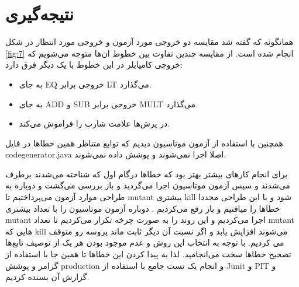\section{نتیجه‌گیری}

همانگونه که گفته شد مقایسه دو خروجی مورد آزمون و خروجی مورد انتظار در شکل \ref{fig:7} انجام شده است. 
از مقایسه چندین تفاوت بین خطوط ان‌ها متوجه می‌شویم که خروجی کامپایلر در این خطوط با یک دیگر فرق دارد:
\begin{itemize}
\item 
به جای EQ خروجی برابر LT می‌گذارد.
\item
به جای ADD و SUB خروجی برابر MULT می‌گذارد.
\item
در پرش‌ها علامت شارپ را فراموش می‌کند.
\end{itemize}

همچنین با استفاده از آزمون موتاسیون دیدیم که توابع متناظر همین خطاها در فایل codegenerator.java اصلا اجرا نمی‌شوند و پوشش داده نمی‌شوند. 

برای انجام کارهای بیشتر بهتر بود که خطاها درگام اول که شناخته می‌شدند برطرف می‌شدند و سپس آزمون موتاسیون اجرا می‌گردید و باز بررسی می‌گشت و دوباره به طراحی موارد آزمون می‌پرداختیم تا mutant بیشتری kill شود و با این طراحی مجددا خطاها را میافتیم و باز رفع می‌کردیم . دوباره آزمون موتاسیون را با تعداد بیشتری mutant اجرا می‌کردیم و این روند را به صورت چرخه تکرار می‌کردیم تا تعداد mutant هایی که kill می‌شوند افزایش یابد و اگر نسبت آن دیگر ثابت ماند پروسه رو متوقف می کردیم. با توجه به انتخاب این روش و عدم موجود بودن هر یک از توصیف تابع‌ها تصحیح خطاها سخت می‌انجامید. لذا به پیدا کردن این خطاها تا همین جا با استفاده از گرامر و پوشش production و انجام یک تست جامع با استفاده از Junit و PIT  و گزارش آن بسنده کردیم.

